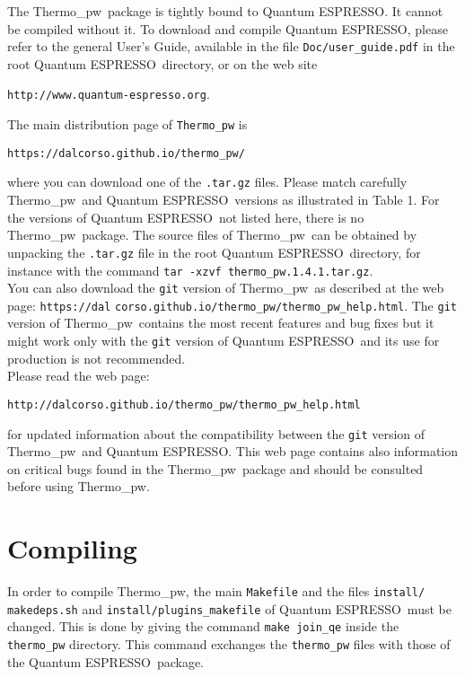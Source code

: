 \documentclass[12pt,a4paper,twoside]{report}
\def\qe{{\sc Quantum ESPRESSO}}
\def\thermo{{\sc Thermo\_pw}}
\begin{document}
The \thermo\ package is tightly bound to \qe. It cannot be compiled without
it. To download and compile \qe, please 
refer to the general User's Guide, available in the file \texttt{Doc/user\_guide.pdf}
in the root \qe\ directory, or on the web site 
\begin{center}
{\texttt{http://www.quantum-espresso.org}}.
\end{center}
The main distribution page of \texttt{Thermo\_pw} is 
\begin{center}
\texttt{https://dalcorso.github.io/thermo\_pw/} 
\end{center}
where you can download one of the \texttt{.tar.gz} files.
Please match carefully \thermo\ and \qe\ versions
as illustrated in Table 1. 
For the versions of \qe\ not listed here, there is no \thermo\ 
package. The source files of \thermo\ can be obtained by
unpacking the \texttt{.tar.gz} file in the root \qe\ directory, for
instance with the command \texttt{tar -xzvf thermo\_pw.1.4.1.tar.gz}.\\
You can also download the \texttt{git} version of 
\thermo\ as described at
the web page: 
\texttt{https://dal} \texttt{corso.github.io/thermo\_pw/thermo\_pw\_help.html}.
The \texttt{git} version of \thermo\ contains the most recent
features and bug fixes but it might work only with the \texttt{git} 
version of \qe\ and its use for production is not recommended. \\
Please read the web page: 
\begin{center}
\texttt{http://dalcorso.github.io/thermo\_pw/thermo\_pw\_help.html} 
\end{center}
for updated information about the compatibility between the \texttt{git} 
version of \thermo\ and \qe. 
This web page contains also information on critical bugs found in the 
\thermo\ package and should be consulted before using 
\thermo.

\newpage
{\color{coral}\section{Compiling}}
\color{black}

In order to compile \thermo, the main \texttt{Makefile} and the files
\texttt{install/} \texttt{makedeps.sh} and \texttt{install/plugins\_makefile}
of \qe\ must be changed. This is done by giving the command 
\texttt{make join\_qe} inside the \texttt{thermo\_pw} directory. 
This command exchanges
the \texttt{thermo\_pw} files with those of the \qe\ package.
\end{document}
